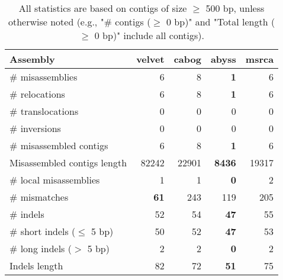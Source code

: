 \documentclass[12pt,a4paper]{article}
\begin{document}
\begin{table}[ht]
\begin{center}
\caption{All statistics are based on contigs of size $\geq$ 500 bp, unless otherwise noted (e.g., "\# contigs ($\geq$ 0 bp)" and "Total length ($\geq$ 0 bp)" include all contigs).}
\begin{tabular}{|l*{4}{|r}|}
\hline
Assembly & velvet & cabog & abyss & msrca \\ \hline
\# misassemblies & 6 & 8 & {\bf 1} & 6 \\ \hline
\hspace{5mm}\# relocations & 6 & 8 & {\bf 1} & 6 \\ \hline
\hspace{5mm}\# translocations & 0 & 0 & 0 & 0 \\ \hline
\hspace{5mm}\# inversions & 0 & 0 & 0 & 0 \\ \hline
\# misassembled contigs & 6 & 8 & {\bf 1} & 6 \\ \hline
Misassembled contigs length & 82242 & 22901 & {\bf 8436} & 19317 \\ \hline
\# local misassemblies & 1 & 1 & {\bf 0} & 2 \\ \hline
\# mismatches & {\bf 61} & 243 & 119 & 205 \\ \hline
\# indels & 52 & 54 & {\bf 47} & 55 \\ \hline
\hspace{5mm}\# short indels ($\leq$ 5 bp) & 50 & 52 & {\bf 47} & 53 \\ \hline
\hspace{5mm}\# long indels ($>$ 5 bp) & 2 & 2 & {\bf 0} & 2 \\ \hline
Indels length & 82 & 72 & {\bf 51} & 75 \\ \hline
\end{tabular}
\end{center}
\end{table}
\end{document}
